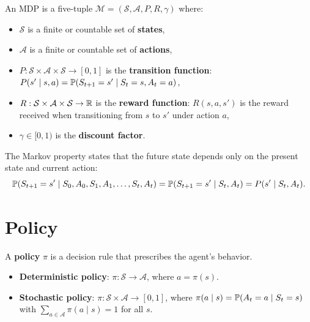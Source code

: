\begin{definition}
An MDP is a five-tuple $\mathcal{M} = (\mathcal{S}, \mathcal{A}, P, R, \gamma)$ where:
\begin{itemize}
    \item $\mathcal{S}$ is a finite or countable set of \textbf{states},
    \item $\mathcal{A}$ is a finite or countable set of \textbf{actions},
    \item $P : \mathcal{S} \times \mathcal{A} \times \mathcal{S} \to [0,1]$ is the
    \textbf{transition function}: $P(s' \mid s, a) = \mathbb{P}(S_{t+1} = s' \mid S_t = s, A_t = a)$,
    \item $R : \mathcal{S} \times \mathcal{A} \times \mathcal{S} \to \mathbb{R}$ is the
    \textbf{reward function}: $R(s, a, s')$ is the reward received when transitioning
    from $s$ to $s'$ under action $a$,
    \item $\gamma \in [0, 1)$ is the \textbf{discount factor}.
\end{itemize}
\end{definition}

\begin{keyformulas}[title=\textbf{Markov Property}]
The Markov property states that the future state depends only on the present
state and current action:
\[
    \mathbb{P}(S_{t+1} = s' \mid S_0, A_0, S_1, A_1, \ldots, S_t, A_t)
    = \mathbb{P}(S_{t+1} = s' \mid S_t, A_t) = P(s' \mid S_t, A_t).
\]
\end{keyformulas}

\section{Policy}

\begin{definition}[Policy]
A \textbf{policy} $\pi$ is a decision rule that prescribes the agent's behavior.
\begin{itemize}
    \item \textbf{Deterministic policy}: $\pi : \mathcal{S} \to \mathcal{A}$,
    where $a = \pi(s)$.
    \item \textbf{Stochastic policy}: $\pi : \mathcal{S} \times \mathcal{A} \to [0,1]$,
    where $\pi(a \mid s) = \mathbb{P}(A_t = a \mid S_t = s)$ with
    $\sum_{a \in \mathcal{A}} \pi(a \mid s) = 1$ for all $s$.
\end{itemize}
\end{definition}

